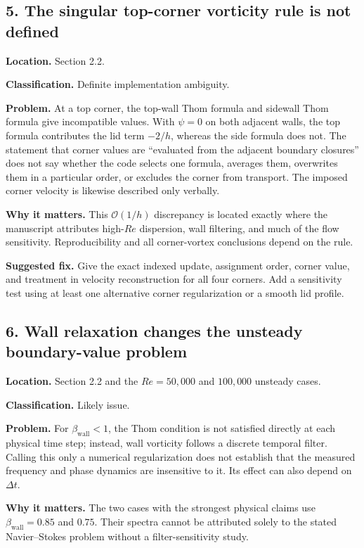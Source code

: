\documentclass[11pt]{article}
\newcommand{\Rey}{\mathit{Re}}
\begin{document}
\subsection*{5. The singular top-corner vorticity rule is not defined}

\textbf{Location.} Section 2.2.

\textbf{Classification.} Definite implementation ambiguity.

\textbf{Problem.} At a top corner, the top-wall Thom formula and sidewall Thom formula give incompatible values. With $\psi=0$ on both adjacent walls, the top formula contributes the lid term $-2/h$, whereas the side formula does not. The statement that corner values are ``evaluated from the adjacent boundary closures'' does not say whether the code selects one formula, averages them, overwrites them in a particular order, or excludes the corner from transport. The imposed corner velocity is likewise described only verbally.

\textbf{Why it matters.} This $\mathcal{O}(1/h)$ discrepancy is located exactly where the manuscript attributes high-$\Rey$ dispersion, wall filtering, and much of the flow sensitivity. Reproducibility and all corner-vortex conclusions depend on the rule.

\textbf{Suggested fix.} Give the exact indexed update, assignment order, corner value, and treatment in velocity reconstruction for all four corners. Add a sensitivity test using at least one alternative corner regularization or a smooth lid profile.

\subsection*{6. Wall relaxation changes the unsteady boundary-value problem}

\textbf{Location.} Section 2.2 and the $\Rey=50{,}000$ and $100{,}000$ unsteady cases.

\textbf{Classification.} Likely issue.

\textbf{Problem.} For $\beta_{\mathrm{wall}}<1$, the Thom condition is not satisfied directly at each physical time step; instead, wall vorticity follows a discrete temporal filter. Calling this only a numerical regularization does not establish that the measured frequency and phase dynamics are insensitive to it. Its effect can also depend on $\Delta t$.

\textbf{Why it matters.} The two cases with the strongest physical claims use $\beta_{\mathrm{wall}}=0.85$ and $0.75$. Their spectra cannot be attributed solely to the stated Navier--Stokes problem without a filter-sensitivity study.
\end{document}
